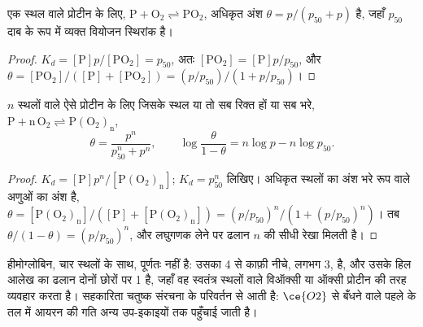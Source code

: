 \begin{proposition}[एक स्थल]\label{prop:b3:bioinorganic:hyperbola}
एक स्थल वाले प्रोटीन के लिए, $\mathrm{P + O_2 \rightleftharpoons PO_2}$, अधिकृत अंश $\theta = p/(p_{50} + p)$ है, जहाँ $p_{50}$
दाब के रूप में व्यक्त वियोजन स्थिरांक है।
\end{proposition}

\begin{proof}
$K_d = [\mathrm P]p/[\mathrm{PO_2}] = p_{50}$, अतः $[\mathrm{PO_2}] = [\mathrm P]p/p_{50}$, और $\theta = [\mathrm{PO_2}]/([\mathrm P] + [\mathrm{PO_2}]) = (p/p_{50})/(1 + p/p_{50})$।
\end{proof}

\begin{theorem}[हिल समीकरण]\label{thm:b3:bioinorganic:hill}
$n$ स्थलों वाले ऐसे प्रोटीन के लिए जिसके स्थल या तो सब रिक्त हों या सब भरे,
$\mathrm{P + n\,O_2 \rightleftharpoons P(O_2)_n}$,
\[
  \theta = \frac{p^n}{p_{50}^n + p^n}, \qquad \log\frac{\theta}{1 - \theta} = n\log p - n\log p_{50}.
\]
\end{theorem}

\begin{proof}
$K_d = [\mathrm P]p^n/[\mathrm{P(O_2)_n}]$; $K_d = p_{50}^n$ लिखिए। अधिकृत स्थलों का अंश भरे रूप वाले
अणुओं का अंश है, $\theta = [\mathrm{P(O_2)_n}]/([\mathrm P] + [\mathrm{P(O_2)_n}]) = (p/p_{50})^n/(1 + (p/p_{50})^n)$। तब $\theta/(1 - \theta) = (p/p_{50})^n$, और
लघुगणक लेने पर ढलान $n$ की सीधी रेखा मिलती है।
\end{proof}

हीमोग्लोबिन, चार स्थलों के साथ, पूर्णतः  नहीं है: उसका 
4 से काफ़ी नीचे, लगभग 3, है, और उसके हिल आलेख का ढलान दोनों छोरों पर 1 है, जहाँ
वह स्वतंत्र स्थलों वाले विऑक्सी या ऑक्सी प्रोटीन की तरह व्यवहार करता है।
सहकारिता चतुष्क संरचना के परिवर्तन से आती है: $\ce{O2}$ से बँधने वाले पहले  के तल में
आयरन की गति अन्य उप-इकाइयों तक पहुँचाई जाती है।

